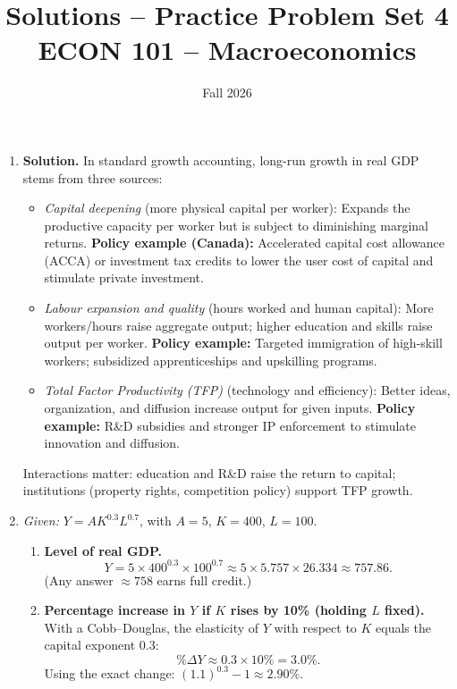 \documentclass[12pt]{article}
\title{Solutions -- Practice Problem Set 4\\ \vspace{10pt} \large ECON 101 -- Macroeconomics}
\author{}
\date{ \vspace{-30pt} Fall 2026}
\begin{document}
\maketitle


\begin{enumerate}[label=\textbf{\arabic*.}, leftmargin=1.5em]

\item \textbf{Solution.} In standard growth accounting, long-run growth in real GDP stems from three sources:
\begin{itemize}[leftmargin=1.2em]
  \item \emph{Capital deepening} (more physical capital per worker): Expands the productive capacity per worker but is subject to diminishing marginal returns. \textbf{Policy example (Canada):} Accelerated capital cost allowance (ACCA) or investment tax credits to lower the user cost of capital and stimulate private investment.
  \item \emph{Labour expansion and quality} (hours worked and human capital): More workers/hours raise aggregate output; higher education and skills raise output per worker. \textbf{Policy example:} Targeted immigration of high-skill workers; subsidized apprenticeships and upskilling programs.
  \item \emph{Total Factor Productivity (TFP)} (technology and efficiency): Better ideas, organization, and diffusion increase output for given inputs. \textbf{Policy example:} R\&D subsidies and stronger IP enforcement to stimulate innovation and diffusion.
\end{itemize}
Interactions matter: education and R\&D raise the return to capital; institutions (property rights, competition policy) support TFP growth.

\vspace{0.75em}

\item \emph{Given:} $Y = A K^{0.3} L^{0.7}$, with $A=5$, $K=400$, $L=100$.
\begin{enumerate}[label=(\alph*)]
\item \textbf{Level of real GDP.}
\[
Y = 5 \times 400^{0.3} \times 100^{0.7} \approx 5 \times 5.757 \times 26.334 \approx \mathbf{757.86}.
\]
(Any answer $\approx 758$ earns full credit.)

\item \textbf{Percentage increase in $Y$ if $K$ rises by 10\% (holding $L$ fixed).}\\
With a Cobb--Douglas, the elasticity of $Y$ with respect to $K$ equals the capital exponent $0.3$:
\[
\%\Delta Y \approx 0.3 \times 10\% = \mathbf{3.0\%}.
\]
Using the exact change: $(1.1)^{0.3}-1 \approx \mathbf{2.90\%}$.


\end{enumerate}
\end{enumerate}
\end{document}

